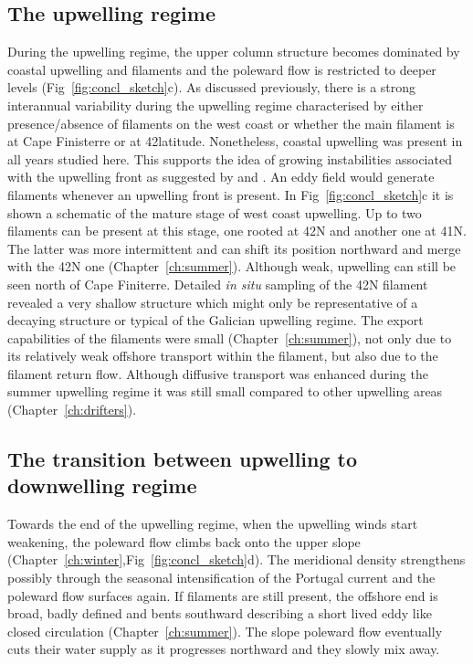 \subsection{The upwelling regime}
During the upwelling regime, the upper column structure becomes
dominated by coastal upwelling and filaments and the poleward flow
is restricted to deeper levels (Fig~\ref{fig:concl_sketch}c). As
discussed previously, there is a strong interannual variability
during the upwelling regime characterised by either
presence/absence of filaments on the west coast or whether the
main filament is at Cape Finisterre or at 42\deg latitude.
Nonetheless, coastal upwelling was present in all years studied
here. This supports the idea of growing instabilities associated
with the upwelling front as suggested by \citet{Hanyes93} and
\citet{Roed99}. An eddy field would generate filaments whenever an
upwelling front is present. In Fig~\ref{fig:concl_sketch}c it is
shown a schematic of the mature stage of west coast upwelling. Up
to two filaments can be present at this stage, one rooted at
42\deg N and another one at 41\deg N. The latter was more
intermittent and can shift its position northward and merge with
the 42\deg N one (Chapter~\ref{ch:summer}). Although weak,
upwelling can still be seen north of Cape Finiterre. Detailed
\emph{in situ} sampling of the 42\deg N filament revealed  a very
shallow structure which might only be representative of a decaying
structure or typical of the Galician upwelling regime. The export
capabilities of the filaments were small
(Chapter~\ref{ch:summer}), not only due to its relatively weak
offshore transport within the filament, but also due to the
filament return flow. Although diffusive transport was enhanced
during the summer upwelling regime it was still small compared to
other upwelling areas (Chapter~\ref{ch:drifters}).

\subsection{The transition between upwelling to downwelling
regime} Towards the end of the upwelling regime, when the
upwelling winds start weakening, the poleward flow climbs back
onto the upper slope
(Chapter~\ref{ch:winter},Fig~\ref{fig:concl_sketch}d). The
meridional density strengthens possibly through the seasonal
intensification of the  Portugal current and the poleward flow
surfaces again. If filaments are still present, the offshore end
is broad, badly defined and bents southward describing a short
lived eddy like closed circulation (Chapter~\ref{ch:summer}). The
slope poleward flow eventually cuts their water supply as it
progresses northward and they slowly mix away.

